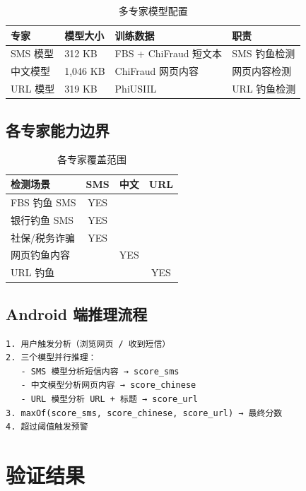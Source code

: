 \documentclass[11pt,a4paper]{article}
\begin{document}
\begin{table}[H]
\centering
\caption{多专家模型配置}
\begin{tabular}{llll}
\toprule
专家 & 模型大小 & 训练数据 & 职责 \\
\midrule
SMS 模型 & 312 KB & FBS + ChiFraud 短文本 & SMS 钓鱼检测 \\
中文模型 & 1,046 KB & ChiFraud 网页内容 & 网页内容检测 \\
URL 模型 & 319 KB & PhiUSIIL & URL 钓鱼检测 \\
\bottomrule
\end{tabular}
\end{table}

\subsection{各专家能力边界}

\begin{table}[H]
\centering
\caption{各专家覆盖范围}
\begin{tabular}{lccc}
\toprule
检测场景 & SMS & 中文 & URL \\
\midrule
FBS 钓鱼 SMS & YES & & \\
银行钓鱼 SMS & YES & & \\
社保/税务诈骗 & YES & & \\
网页钓鱼内容 & & YES & \\
URL 钓鱼 & & & YES \\
\bottomrule
\end{tabular}
\end{table}

\subsection{Android 端推理流程}

\begin{Verbatim}[frame=single,fontsize=\small,label=maxOf() 融合推理流程]
1. 用户触发分析（浏览网页 / 收到短信）
2. 三个模型并行推理：
   - SMS 模型分析短信内容 → score_sms
   - 中文模型分析网页内容 → score_chinese
   - URL 模型分析 URL + 标题 → score_url
3. maxOf(score_sms, score_chinese, score_url) → 最终分数
4. 超过阈值触发预警
\end{Verbatim}

\section{验证结果}
\end{document}
